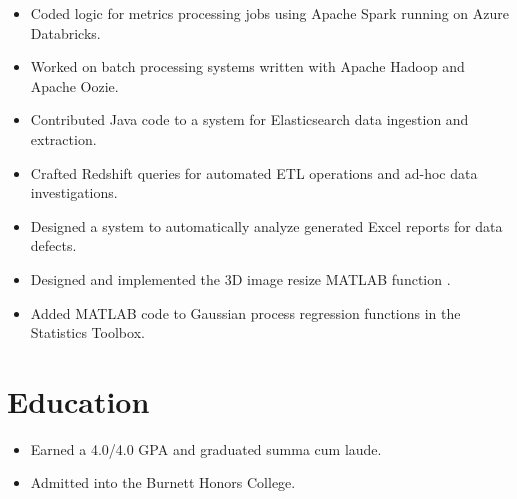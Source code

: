 \documentclass[letterpaper]{resume}
\begin{document}
\begin{minipage}[t]{0.77\columnwidth}
\sectionspace

\vspace{2pt}
\begin{itemize}
\item Coded logic for metrics processing jobs using Apache Spark running on Azure Databricks.
\item Worked on batch processing systems written with Apache Hadoop and Apache Oozie.
\end{itemize}

\sectionspace

\vspace{2pt}
\begin{itemize}
\item Contributed Java code to a system for Elasticsearch data ingestion and extraction.
\item Crafted Redshift queries for automated ETL operations and ad-hoc data investigations.
\item Designed a system to automatically analyze generated Excel reports for data defects.
\end{itemize}

\sectionspace

\vspace{2pt}
\begin{itemize}
\item Designed and implemented the 3D image resize MATLAB function .
\item Added MATLAB code to Gaussian process regression functions in the Statistics Toolbox.
\end{itemize}

\sectionspace


\section{Education}

\vspace{2pt}
\begin{itemize}
\item Earned a 4.0/4.0 GPA and graduated summa cum laude.
\item Admitted into the Burnett Honors College.
\end{itemize}


\end{minipage}
\end{document}
